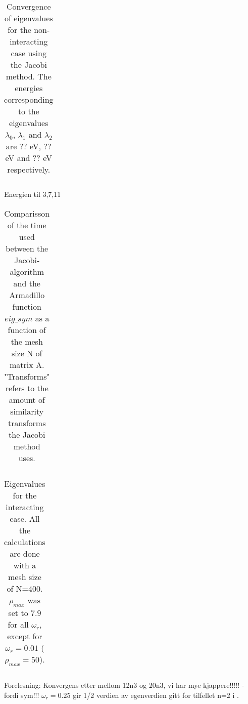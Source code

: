 
\begin{table}[H]\caption{Convergence of eigenvalues for the non-interacting case using the Jacobi method. The energies corresponding to the eigenvalues $\lambda_0$, $\lambda_1$ and $\lambda_2$ are ?? eV, ?? eV and ?? eV respectively.}
	\label{tab:eigval}
	\begin{tabular}{cccc}
		
	\end{tabular}
\end{table}

Energien til 3,7,11	


\begin{table}[H]\caption{Comparisson of the time used between the Jacobi-algorithm and the Armadillo function  $eig\_sym$ as a function of the mesh size N of matrix A. "Transforms" refers to the amount of similarity transforms the Jacobi method uses.}
	\label{tab:time}
	\begin{tabular}{cccccc}
		
	\end{tabular}
\end{table}

\begin{table}[H]\caption{Eigenvalues for the interacting case. All the calculations are done with a mesh size of N=400. $ \rho_{max} $ was set to $ 7.9 $ for all $ \omega_r $, except for $ \omega_r  = 0.01$ ( $ \rho_{max} =50$). }
	\label{tab:omega}
	\begin{tabular}{cccc}
		
	\end{tabular}
\end{table}

Forelesning: Konvergens etter mellom 12n3 og 20n3, vi har mye kjappere!!!!! - fordi sym!!!
$ \omega_r= 0.25 $ gir 1/2 verdien av egenverdien gitt for tilfellet n=2 i \cite{litterature}. 